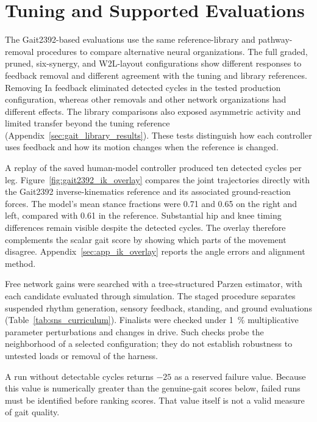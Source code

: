 \section{Tuning and Supported Evaluations}

The Gait2392-based evaluations use the same reference-library and pathway-removal procedures to compare alternative neural organizations. The full graded, pruned, six-synergy, and W2L-layout configurations show different responses to feedback removal and different agreement with the tuning and library references. Removing Ia feedback eliminated detected cycles in the tested production configuration, whereas other removals and other network organizations had different effects. The library comparisons also exposed asymmetric activity and limited transfer beyond the tuning reference (Appendix~\ref{sec:gait_library_results}). These tests distinguish how each controller uses feedback and how its motion changes when the reference is changed.

A replay of the saved human-model controller produced ten detected cycles per leg. Figure~\ref{fig:gait2392_ik_overlay} compares the joint trajectories directly with the Gait2392 inverse-kinematics reference and its associated ground-reaction forces. The model's mean stance fractions were 0.71 and 0.65 on the right and left, compared with 0.61 in the reference. Substantial hip and knee timing differences remain visible despite the detected cycles. The overlay therefore complements the scalar gait score by showing which parts of the movement disagree. Appendix~\ref{sec:app_ik_overlay} reports the angle errors and alignment method.
\label{sec:sns_tuning_methods}\label{sec:sns_curriculum}

Free network gains were searched with a tree-structured Parzen estimator, with each candidate evaluated through simulation. The staged procedure separates suspended rhythm generation, sensory feedback, standing, and ground evaluations (Table~\ref{tab:sns_curriculum}). Finalists were checked under \qty{1}{\percent} multiplicative parameter perturbations and changes in drive. Such checks probe the neighborhood of a selected configuration; they do not establish robustness to untested loads or removal of the harness.

A run without detectable cycles returns $-25$ as a reserved failure value. Because this value is numerically greater than the genuine-gait scores below, failed runs must be identified before ranking scores. That value itself is not a valid measure of gait quality.

